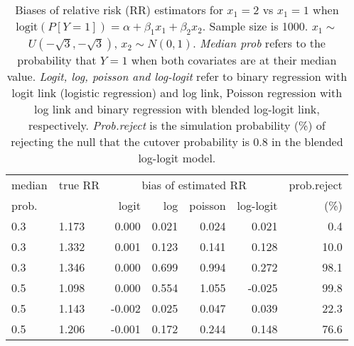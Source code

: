 \documentclass[12pt,a4paper]{article}
\begin{document}
\begin{table}[H] 
\small\sf\centering 
\caption{Biases of relative risk (RR) estimators for $x_1=2$ vs $x_1=1$ when $\mbox{logit}(P[Y=1])=\alpha+\beta_1 x_1 + \beta_2 x_2$. Sample size is 1000. $x_1 \sim $$U(-\sqrt{3},-\sqrt{3})$, $x_2 \sim N(0,1)$. {\it Median prob} refers to the probability that $Y=1$ when both covariates are at their median value. {\it Logit, log, poisson and log-logit} refer to binary regression with logit link (logistic regression) and log link, Poisson regression with log link and binary regression with blended log-logit link, respectively. {\it Prob.reject} is the simulation probability (\%) of rejecting the null that the cutover probability is $0.8$ in the blended log-logit model.} 
\begin{tabular}{llrrrrr} 
\toprule 
median & true RR & \multicolumn{4}{c}{bias of estimated RR} & prob.reject \\ 
prob. & & logit & log & poisson & log-logit  & (\%) \\ \midrule 
0.3 & 1.173 &  0.000 & 0.021 & 0.024 &  0.021 &  0.4 \\  
0.3 & 1.332 &  0.001 & 0.123 & 0.141 &  0.128 & 10.0 \\  
0.3 & 1.346 &  0.000 & 0.699 & 0.994 &  0.272 & 98.1 \\  
0.5 & 1.098 &  0.000 & 0.554 & 1.055 & -0.025 & 99.8 \\  
0.5 & 1.143 & -0.002 & 0.025 & 0.047 &  0.039 & 22.3 \\  
0.5 & 1.206 & -0.001 & 0.172 & 0.244 &  0.148 & 76.6 \\  
\bottomrule 
\end{tabular} 
\end{table} 
\end{document}

